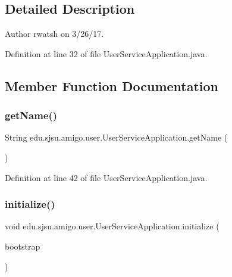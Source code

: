 \subsection{Detailed Description}
\begin{DoxyAuthor}{Author}
rwatsh on 3/26/17. 
\end{DoxyAuthor}


Definition at line 32 of file User\+Service\+Application.\+java.



\subsection{Member Function Documentation}
\mbox{\label{classedu_1_1sjsu_1_1amigo_1_1user_1_1_user_service_application_a7f233d7a5f9b640b055edfd529f76b8a}} 
\subsubsection{\texorpdfstring{get\+Name()}{getName()}}
{\footnotesize\ttfamily String edu.\+sjsu.\+amigo.\+user.\+User\+Service\+Application.\+get\+Name (\begin{DoxyParamCaption}{ }\end{DoxyParamCaption})}



Definition at line 42 of file User\+Service\+Application.\+java.

\mbox{\label{classedu_1_1sjsu_1_1amigo_1_1user_1_1_user_service_application_a04efc0d795120671dcdd3f0936ab2a93}} 
\subsubsection{\texorpdfstring{initialize()}{initialize()}}
{\footnotesize\ttfamily void edu.\+sjsu.\+amigo.\+user.\+User\+Service\+Application.\+initialize (\begin{DoxyParamCaption}\item[{final Bootstrap$<$ \hyperlink{classedu_1_1sjsu_1_1amigo_1_1user_1_1_user_service_configuration}{User\+Service\+Configuration} $>$}]{bootstrap }\end{DoxyParamCaption})}



